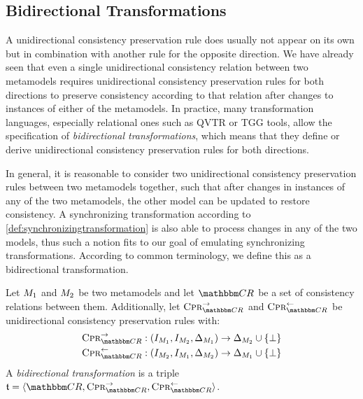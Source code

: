 \subsection{Bidirectional Transformations}

A unidirectional consistency preservation rule does usually not appear on its own but in combination with another rule for the opposite direction.
We have already seen that even a single unidirectional consistency relation between two metamodels requires unidirectional consistency preservation rules for both directions to preserve consistency according to that relation after changes to instances of either of the metamodels.
In practice, many transformation languages, especially relational ones such as \gls{QVTR} or \gls{TGG} tools, allow the specification of \emph{bidirectional transformations}, which means that they define or derive unidirectional consistency preservation rules for both directions.

In general, it is reasonable to consider two unidirectional consistency preservation rules between two metamodels together, such that after changes in instances of any of the two metamodels, the other model can be updated to restore consistency.
A synchronizing transformation according to \autoref{def:synchronizingtransformation} is also able to process changes in any of the two models, thus such a notion fits to our goal of emulating synchronizing transformations.
According to common terminology, we define this as a bidirectional transformation.

\begin{definition}
    \label{def:bidirectionaltransformation}
    Let $M_{1}$ and $M_{2}$ be two metamodels and let $\consistencyrelationset{CR}$ be a set of consistency relations between them.
    Additionally, let $\consistencypreservationrule{\consistencyrelationset{CR}}^{\rightarrow}$ and $\consistencypreservationrule{\consistencyrelationset{CR}}^{\leftarrow}$ be unidirectional consistency preservation rules with:
    \begin{align*}
        &
        \consistencypreservationrule{\consistencyrelationset{CR}}^{\rightarrow} : (\metamodelinstanceset{M}{1}, \metamodelinstanceset{M}{2}, \changeuniverse{\metamodel{M}{1}}) \rightarrow \changeuniverse{\metamodel{M}{2}} \cup \setted{\bot} \\
        &
        \consistencypreservationrule{\consistencyrelationset{CR}}^{\leftarrow} : (\metamodelinstanceset{M}{2}, \metamodelinstanceset{M}{1}, \changeuniverse{\metamodel{M}{2}}) \rightarrow \changeuniverse{\metamodel{M}{1}} \cup \setted{\bot}
    \end{align*}
    A \emph{bidirectional transformation} is a triple $\transformation{t} = \tupled{\consistencyrelationset{CR},\consistencypreservationrule{\consistencyrelationset{CR}}^{\rightarrow}, \consistencypreservationrule{\consistencyrelationset{CR}}^{\leftarrow}}$.
\end{definition}

